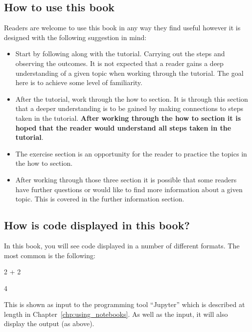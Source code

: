 \subsection{How to use this book}
Readers are welcome to use this book in any way they find useful however it is
designed with the following suggestion in mind:
\begin{itemize}
\item Start by following along with the tutorial. Carrying out the steps and
observing the outcomes. It is not expected that a reader gains a deep
understanding of a given topic when working through the tutorial. The goal
here is to achieve some level of familiarity.

\item After the tutorial, work through the how to section. It is through this
section that a deeper understanding is to be gained by making connections to
steps taken in the tutorial. \textbf{After working through the how to section it is
hoped that the reader would understand all steps taken in the tutorial}.

\item The exercise section is an opportunity for the reader to practice the topics
in the how to section.

\item After working through those three section it is possible that some readers
have further questions or would like to find more information about a
given topic. This is covered in the further information section.

\end{itemize}

\subsection{How is code displayed in this book?}

In this book, you will see code displayed in a number of different formats. The
most common is the following:

\begin{pyin}
2 + 2
\end{pyin}

\begin{raw}
4
\end{raw}

This is shown as input to the programming tool ``Jupyter'' which is described at
length in Chapter~\ref{chp:using_notebooks}. As well as the input, it will also
display the output (as above).

